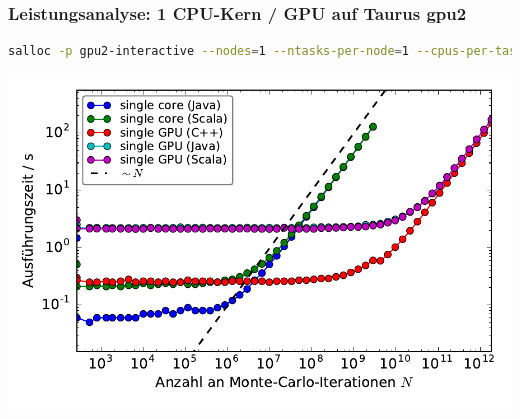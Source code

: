 \begin{frame}[fragile]
    \frametitle{Leistungsanalyse: 1 CPU-Kern / GPU auf Taurus gpu2}
    \begin{lstlisting}[language=bash,breakautoindent=false,numbers=none]
salloc -p gpu2-interactive --nodes=1 --ntasks-per-node=1 --cpus-per-task=1 --gres=gpu:1 --time=02:00:00
\end{lstlisting}\vspace{-1.5\baselineskip}
    \centerline{\includegraphics[width=0.9\linewidth]{benchmarks-workload-scaling.pdf}}
\end{frame}


